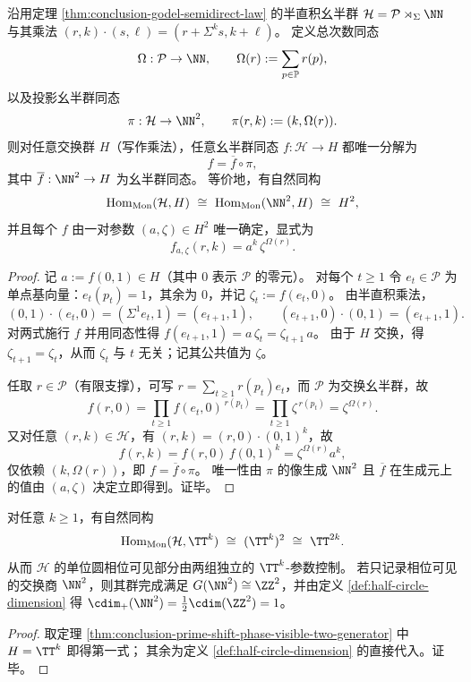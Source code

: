 \begin{theorem}\label{thm:conclusion-prime-shift-phase-visible-two-generator}
沿用定理 \ref{thm:conclusion-godel-semidirect-law} 的半直积幺半群
\(
\mathcal H=\mathcal P\rtimes_{\Sigma}\NN
\)
与其乘法 \((r,k)\cdot(s,\ell)=(r+\Sigma^k s,k+\ell)\)。
定义总次数同态
\[
\Omega:\mathcal P\to\NN,\qquad \Omega(r):=\sum_{p\in\mathbb P}r(p),
\]
以及投影幺半群同态
\[
\pi:\mathcal H\to\NN^2,\qquad \pi(r,k):=(k,\Omega(r)).
\]
则对任意交换群 \(H\)（写作乘法），任意幺半群同态 \(f:\mathcal H\to H\) 都唯一分解为
\[
f=\overline f\circ \pi,
\]
其中 \(\overline f:\NN^2\to H\) 为幺半群同态。
等价地，有自然同构
\[
\mathrm{Hom}_{\mathrm{Mon}}(\mathcal H,H)\ \cong\ \mathrm{Hom}_{\mathrm{Mon}}(\NN^2,H)\ \cong\ H^2,
\]
并且每个 \(f\) 由一对参数 \((a,\zeta)\in H^2\) 唯一确定，显式为
\[
f_{a,\zeta}(r,k)=a^k\,\zeta^{\Omega(r)}.
\]
\end{theorem}
\begin{proof}
记 \(a:=f(0,1)\in H\)（其中 \(0\) 表示 \(\mathcal P\) 的零元）。
对每个 \(t\ge 1\) 令 \(e_t\in\mathcal P\) 为单点基向量：\(e_t(p_t)=1\)，其余为 \(0\)，并记 \(\zeta_t:=f(e_t,0)\)。
由半直积乘法，
\[
(0,1)\cdot(e_t,0)=(\Sigma^1 e_t,1)=(e_{t+1},1),
\qquad
(e_{t+1},0)\cdot(0,1)=(e_{t+1},1).
\]
对两式施行 \(f\) 并用同态性得
\(
f(e_{t+1},1)=a\,\zeta_t=\zeta_{t+1}\,a
\)。
由于 \(H\) 交换，得 \(\zeta_{t+1}=\zeta_t\)，从而 \(\zeta_t\) 与 \(t\) 无关；记其公共值为 \(\zeta\)。
\par
任取 \(r\in\mathcal P\)（有限支撑），可写 \(r=\sum_{t\ge 1}r(p_t)e_t\)，而 \(\mathcal P\) 为交换幺半群，故
\[
f(r,0)=\prod_{t\ge 1}f(e_t,0)^{\,r(p_t)}=\prod_{t\ge 1}\zeta^{\,r(p_t)}=\zeta^{\Omega(r)}.
\]
又对任意 \((r,k)\in\mathcal H\)，有 \((r,k)=(r,0)\cdot(0,1)^k\)，故
\[
f(r,k)=f(r,0)\,f(0,1)^k=\zeta^{\Omega(r)}a^k,
\]
仅依赖 \((k,\Omega(r))\)，即 \(f=\overline f\circ\pi\)。
唯一性由 \(\pi\) 的像生成 \(\NN^2\) 且 \(\overline f\) 在生成元上的值由 \((a,\zeta)\) 决定立即得到。证毕。
\end{proof}

\begin{corollary}[相位字符空间与圆维解释]\label{cor:conclusion-prime-shift-phase-character-torus-cdim}
对任意 \(k\ge 1\)，有自然同构
\[
\mathrm{Hom}_{\mathrm{Mon}}(\mathcal H,\TT^k)\ \cong\ (\TT^k)^2\ \cong\ \TT^{2k}.
\]
从而 \(\mathcal H\) 的单位圆相位可见部分由两组独立的 \(\TT^k\)-参数控制。
若只记录相位可见的交换商 \(\NN^2\)，则其群完成满足 \(G(\NN^2)\cong\ZZ^2\)，并由定义 \ref{def:half-circle-dimension} 得
\(
\cdim_+(\NN^2)=\tfrac12\cdim(\ZZ^2)=1
\)。
\end{corollary}
\begin{proof}
取定理 \ref{thm:conclusion-prime-shift-phase-visible-two-generator} 中 \(H=\TT^k\) 即得第一式；
其余为定义 \ref{def:half-circle-dimension} 的直接代入。证毕。
\end{proof}

